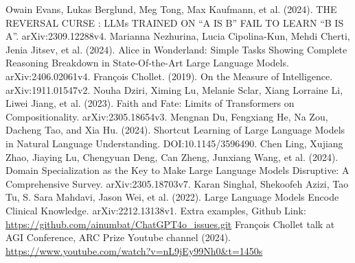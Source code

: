 \documentclass[11pt]{scrartcl}
\begin{document}
\begin{thebibliography}{9}  %

	Owain Evans, Lukas Berglund, Meg Tong, Max Kaufmann, et al. (2024). THE REVERSAL CURSE : LLMs TRAINED ON “A IS B” FAIL TO LEARN “B IS A”. arXiv:2309.12288v4.      
    Marianna Nezhurina, Lucia Cipolina-Kun, Mehdi Cherti, Jenia Jitsev, et al. (2024). Alice in Wonderland: Simple Tasks Showing Complete Reasoning Breakdown in State-Of-the-Art Large Language Models. arXiv:2406.02061v4.
    François Chollet. (2019). On the Measure of Intelligence. arXiv:1911.01547v2.
    Nouha Dziri, Ximing Lu, Melanie Sclar, Xiang Lorraine Li, Liwei Jiang, et al. (2023). Faith and Fate: Limits of Transformers on Compositionality. arXiv:2305.18654v3.
    Mengnan Du, Fengxiang He, Na Zou, Dacheng Tao, and Xia Hu. (2024). Shortcut Learning of Large Language Models in Natural Language Understanding. DOI:10.1145/3596490.
    Chen Ling, Xujiang Zhao, Jiaying Lu, Chengyuan Deng, Can Zheng, Junxiang Wang, et al. (2024). Domain Specialization as the Key to Make Large Language Models Disruptive: A Comprehensive Survey. arXiv:2305.18703v7.
	Karan Singhal, Shekoofeh Azizi, Tao Tu, S. Sara Mahdavi, Jason Wei, et al. (2022). Large Language Models Encode Clinical Knowledge. arXiv:2212.13138v1.
	Extra examples, Github Link: \url{https://github.com/ainumbat/ChatGPT4o_issues.git}
	François Chollet talk at AGI Conference, ARC Prize Youtube channel (2024). \url{https://www.youtube.com/watch?v=nL9jEy99Nh0&t=1450s}
    
\end{thebibliography}
\end{document}
